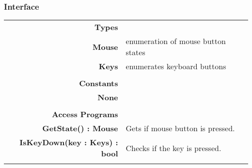 \documentclass[10pt]{article}
\begin{document}
    \subsubsection{Interface}
        \begin{tabularx}{\linewidth}{@{} >{\bfseries}r Xp{5cm} }
            Types           & \begin{tabular}[t]{@{} l p{8cm}} 
                                     & \\
                                    Mouse & enumeration of mouse button states \\
                                    Keys & enumerates keyboard buttons \\
                              \end{tabular} \\
                              
            Constants       & \begin{tabular}[t]{@{} l p{8cm}} 
                                     & \\
                                    None & \\
                              \end{tabular} \\

            Access Programs & \begin{tabular}[t]{@{} l p{8cm}}
                                     & \\
                                    GetState() : Mouse & Gets if mouse button is pressed. \\
                                    IsKeyDown(key : Keys) : bool & Checks if the key is pressed. \\
                              \end{tabular}
        \end{tabularx}
        
\end{document}
